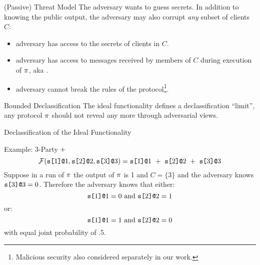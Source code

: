 \documentclass{beamer}
\begin{document}
\begin{frame}{(Passive) Threat Model}
  The adversary wants to guess secrets. In addition to knowing the public
  output, the adversary may also corrupt \emph{any} subset of clients $C$:
  \begin{itemize}
  \item adversary has access to the secrets of clients in $C$.
  \item adversary has access to messages received by members of $C$ during execution of $\pi$,
    aka .
  \item adversary cannot break the rules of the protocol\footnote{Malicious security also
  considered separately in our work.}.
  \end{itemize}

  \begin{alertblock}{Bounded Declassification}
    The ideal functionality defines a declassification ``limit'', any protocol $\pi$
    should not reveal any more through adversarial views.
  \end{alertblock}
\end{frame}

\begin{frame}{Declassification of the Ideal Functionality}

  \begin{exampleblock}{Example: 3-Party $+$} %
  $$
  \mathcal{F}(\texttt{s[}1\texttt{]}\texttt{@}1,\texttt{s[}2\texttt{]}\texttt{@}2,\texttt{s[}3\texttt{]}\texttt{@}3) =
  \texttt{s[}1\texttt{]}\texttt{@}1\ +\ \texttt{s[}2\texttt{]}\texttt{@}2\ +\ \texttt{s[}3\texttt{]}\texttt{@}3
  $$
  Suppose in a run of $\pi$ the output of $\pi$ is 1 and $C = \{ 3 \}$ and
  the adversary knows $\texttt{s[}3\texttt{]}\texttt{@}3 = 0$.
  Therefore the adversary knows that either:
  $$
  \texttt{s[}1\texttt{]}\texttt{@}1 = 0 \text{\ and\ } \texttt{s[}2\texttt{]}\texttt{@}2 = 1
  $$
  or:
  $$
  \texttt{s[}1\texttt{]}\texttt{@}1 = 1 \text{\ and\ } \texttt{s[}2\texttt{]}\texttt{@}2 = 0
  $$
  with equal joint probability of .5. 
  \end{exampleblock}
  
\end{frame}
\end{document}
